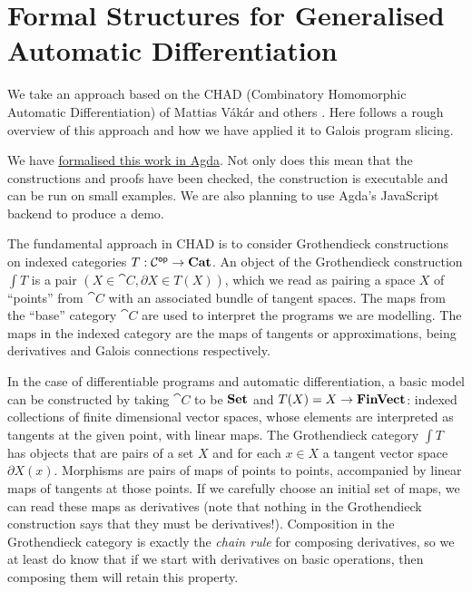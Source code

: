 \section{Formal Structures for Generalised Automatic Differentiation}


We take an approach based on the CHAD (Combinatory Homomorphic Automatic Differentiation) of Mattias Vákár and others \cite{nunes2023}. Here follows a rough overview of this approach and how we have applied it to Galois program slicing. 

We have \href{https://github.com/bobatkey/approx-diff}{formalised this work in Agda}. Not only does this mean that the constructions and proofs have been checked, the construction is executable and can be run on small examples. We are also planning to use Agda's JavaScript backend to produce a demo.

The fundamental approach in CHAD is to consider Grothendieck constructions on indexed categories $T : \mathcal{C}^{\mathsf{op}} \to \mathbf{Cat}$. An object of the Grothendieck construction $\int T$ is a pair $(X \in \cat{C}, \partial X \in T(X))$, which we read as pairing a space $X$ of ``points'' from $\cat{C}$ with an associated bundle of tangent spaces. The maps from the ``base'' category $\cat{C}$ are used to interpret the programs we are modelling. The maps in the indexed category are the maps of tangents or approximations, being derivatives and Galois connections respectively.

In the case of differentiable programs and automatic differentiation, a basic model can be constructed by taking $\cat{C}$ to be $\mathbf{Set}$ and $T(X) = X \to \mathbf{FinVect}$: indexed collections of finite dimensional vector spaces, whose elements are interpreted as tangents at the given point, with linear maps. The Grothendieck category $\int T$ has objects that are pairs of a set $X$ and for each $x \in X$ a tangent vector space $\partial X(x)$. Morphisms are pairs of maps of points to points, accompanied by linear maps of tangents at those points. If we carefully choose an initial set of maps, we can read these maps as derivatives (note that nothing in the Grothendieck construction says that they must be derivatives!). Composition in the Grothendieck category is exactly the {\em chain rule} for composing derivatives, so we at least do know that if we start with derivatives on basic operations, then composing them will retain this property.

